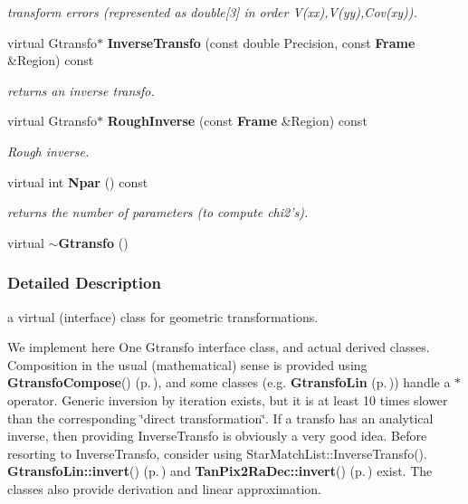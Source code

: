 \begin{CompactItemize}
\begin{CompactList}\small\item\em transform errors (represented as double[3] in order V(xx),V(yy),Cov(xy)).\item\end{CompactList}\item 
virtual Gtransfo$\ast$ {\bf Inverse\-Transfo} (const double Precision, const {\bf Frame} \&Region) const
\begin{CompactList}\small\item\em returns an inverse transfo.\item\end{CompactList}\item 
virtual Gtransfo$\ast$ {\bf Rough\-Inverse} (const {\bf Frame} \&Region) const
\begin{CompactList}\small\item\em Rough inverse.\item\end{CompactList}\item 
{}
virtual int {\bf Npar} () const\label{class_gtransfo_a14}

\begin{CompactList}\small\item\em returns the number of parameters (to compute chi2's).\item\end{CompactList}\item 
{}
virtual {\bf $\sim$Gtransfo} ()\label{class_gtransfo_a15}

\end{CompactItemize}


\subsubsection{Detailed Description}
a virtual (interface) class for geometric transformations.

We implement here One Gtransfo interface class, and actual derived classes. Composition in the usual (mathematical) sense is provided using {\bf Gtransfo\-Compose}() {\rm (p.\,\pageref{gtransfo_h_a1})}, and some classes (e.g. {\bf Gtransfo\-Lin} {\rm (p.\,\pageref{class_gtransfolin})}) handle a $\ast$ operator. Generic inversion by iteration exists, but it is at least 10 times slower than the corresponding \char`\"{}direct transformation\char`\"{}. If a transfo has an analytical inverse, then providing Inverse\-Transfo is obviously a very good idea. Before resorting to Inverse\-Transfo, consider using Star\-Match\-List::Inverse\-Transfo(). {\bf Gtransfo\-Lin::invert}() {\rm (p.\,\pageref{class_gtransfolin_a2})} and {\bf Tan\-Pix2Ra\-Dec::invert}() {\rm (p.\,\pageref{class_tanpix2radec_a7})} exist. The classes also provide derivation and linear approximation. 




